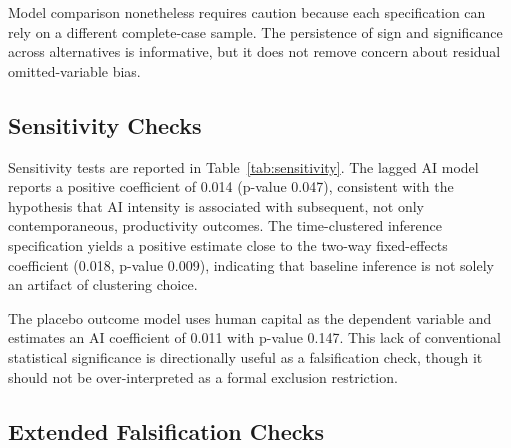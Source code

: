 Model comparison nonetheless requires caution because each specification can rely on a different complete-case sample. The persistence of sign and significance across alternatives is informative, but it does not remove concern about residual omitted-variable bias.

\subsection{Sensitivity Checks}

Sensitivity tests are reported in Table~\ref{tab:sensitivity}. The lagged AI model reports a positive coefficient of 0.014 (p-value 0.047), consistent with the hypothesis that AI intensity is associated with subsequent, not only contemporaneous, productivity outcomes. The time-clustered inference specification yields a positive estimate close to the two-way fixed-effects coefficient (0.018, p-value 0.009), indicating that baseline inference is not solely an artifact of clustering choice.

\begin{table}[h!]
\centering
\caption{Sensitivity Checks: Lag, Clustering, and Placebo Outcome}
\label{tab:sensitivity}

\end{table}

The placebo outcome model uses human capital as the dependent variable and estimates an AI coefficient of 0.011 with p-value 0.147. This lack of conventional statistical significance is directionally useful as a falsification check, though it should not be over-interpreted as a formal exclusion restriction.

\subsection{Extended Falsification Checks}



\begin{table}[h!]
\centering
\caption{Extended Falsification Checks}
\label{tab:falsification}

\end{table}

\begin{table}[h!]
\centering
\caption{Country-Years With vs. Without AI Data: Observable Characteristics}
\label{tab:sample-selection}

\end{table}

